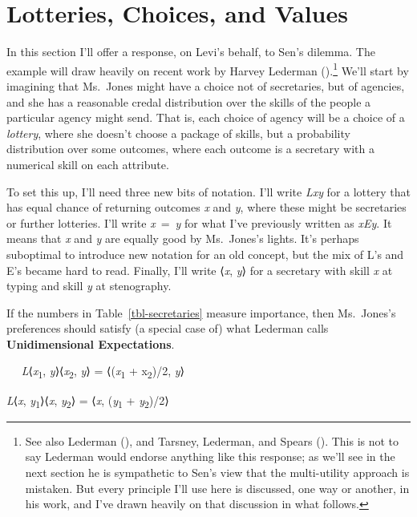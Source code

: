 \documentclass[
  11pt,
  letterpaper,
  DIV=11,
  numbers=noendperiod,
  twoside]{scrartcl}
\providecommand{\tightlist}{%
  \setlength{\itemsep}{0pt}\setlength{\parskip}{0pt}}
\begin{document}
\section{Lotteries, Choices, and Values}\label{sec-lotteries}

In this section I'll offer a response, on Levi's behalf, to Sen's
dilemma. The example will draw heavily on recent work by Harvey Lederman
().\footnote{See also Lederman
  (), and Tarsney, Lederman, and Spears
  (). This is not to say
  Lederman would endorse anything like this response; as we'll see in
  the next section he is sympathetic to Sen's view that the
  multi-utility approach is mistaken. But every principle I'll use here
  is discussed, one way or another, in his work, and I've drawn heavily
  on that discussion in what follows.} We'll start by imagining that
Ms.~Jones might have a choice not of secretaries, but of agencies, and
she has a reasonable credal distribution over the skills of the people a
particular agency might send. That is, each choice of agency will be a
choice of a \emph{lottery}, where she doesn't choose a package of
skills, but a probability distribution over some outcomes, where each
outcome is a secretary with a numerical skill on each attribute.

To set this up, I'll need three new bits of notation. I'll write
\emph{Lxy} for a lottery that has equal chance of returning outcomes
\emph{x} and \emph{y}, where these might be secretaries or further
lotteries. I'll write \emph{x}~=~\emph{y} for what I've previously
written as \emph{xEy}. It means that \emph{x} and \emph{y} are equally
good by Ms.~Jones's lights. It's perhaps suboptimal to introduce new
notation for an old concept, but the mix of L's and E's became hard to
read. Finally, I'll write ⟨\emph{x}, \emph{y}⟩ for a secretary with
skill \emph{x} at typing and skill \emph{y} at stenography.

If the numbers in Table~\ref{tbl-secretaries} measure importance, then
Ms.~Jones's preferences should satisfy (a special case of) what Lederman
calls \textbf{Unidimensional Expectations}.

\begin{description}
\tightlist
\item[Unidimensional Expectations (UE)]
~\newline~ \emph{L}⟨\emph{x}\textsubscript{1},
\emph{y}⟩⟨\emph{x}\textsubscript{2}, \emph{y}⟩ =
⟨(\emph{x}\textsubscript{1} + x\textsubscript{2})/2, \emph{y}⟩

\emph{L}⟨\emph{x}, \emph{y}\textsubscript{1}⟩⟨\emph{x},
\emph{y}\textsubscript{2}⟩ = ⟨\emph{x}, (\emph{y}\textsubscript{1} +
\emph{y}\textsubscript{2})/2⟩
\end{description}
\end{document}
